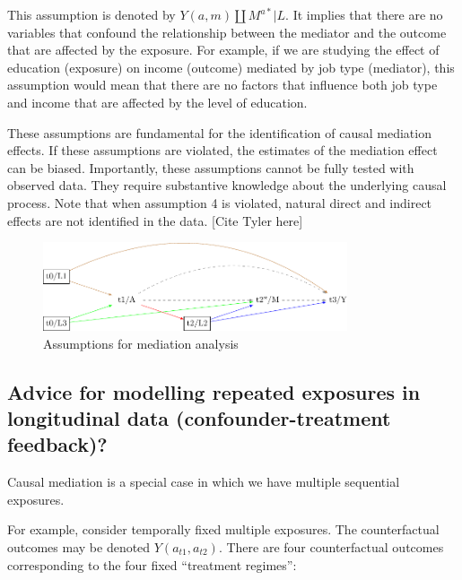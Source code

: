 \documentclass[
  singlecolumn]{report}
\begin{document}
This assumption is denoted by \(Y(a,m) \coprod M^{a*} | L\). It implies
that there are no variables that confound the relationship between the
mediator and the outcome that are affected by the exposure. For example,
if we are studying the effect of education (exposure) on income
(outcome) mediated by job type (mediator), this assumption would mean
that there are no factors that influence both job type and income that
are affected by the level of education.

These assumptions are fundamental for the identification of causal
mediation effects. If these assumptions are violated, the estimates of
the mediation effect can be biased. Importantly, these assumptions
cannot be fully tested with observed data. They require substantive
knowledge about the underlying causal process. Note that when assumption
4 is violated, natural direct and indirect effects are not identified in
the data. {[}Cite Tyler here{]}

\begin{figure}

{\centering \includegraphics[width=0.8\textwidth,height=\textheight]{causal-dags_files/figure-pdf/fig-dag-mediation-assuptions-1.pdf}

}

\caption{\label{fig-dag-mediation-assuptions}Assumptions for mediation
analysis}

\end{figure}

\hypertarget{advice-for-modelling-repeated-exposures-in-longitudinal-data-confounder-treatment-feedback}{%
\subsection{Advice for modelling repeated exposures in longitudinal data
(confounder-treatment
feedback)?}\label{advice-for-modelling-repeated-exposures-in-longitudinal-data-confounder-treatment-feedback}}

Causal mediation is a special case in which we have multiple sequential
exposures.

For example, consider temporally fixed multiple exposures. The
counterfactual outcomes may be denoted \(Y(a_{t1} ,a_{t2})\). There are
four counterfactual outcomes corresponding to the four fixed ``treatment
regimes'':
\end{document}
